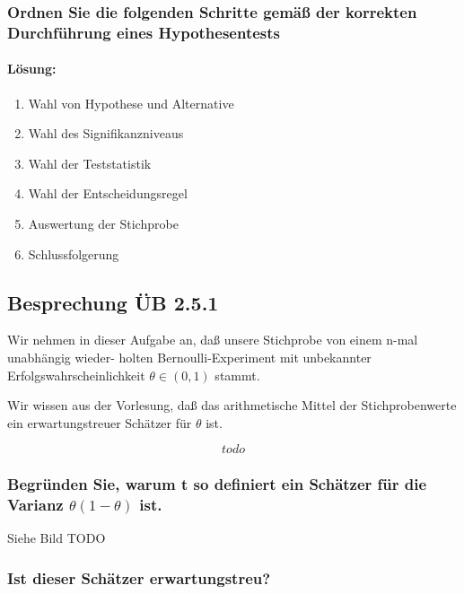 
\begin{auf}
    \subsubsection*{Ordnen Sie die folgenden Schritte gemäß der korrekten Durchführung eines Hypothesentests}
    \paragraph{Lösung:}
    \begin{enumerate}
        \item Wahl von Hypothese und Alternative
        \item Wahl des Signifikanzniveaus
        \item Wahl der Teststatistik
        \item Wahl der Entscheidungsregel
        \item Auswertung der Stichprobe
        \item Schlussfolgerung
    \end{enumerate}
\end{auf}

\subsection{Besprechung ÜB 2.5.1}\label{sec:besprechung-ub-2.5.1}
Wir nehmen in dieser Aufgabe an, daß unsere Stichprobe von einem n-mal unabhängig wieder-
holten Bernoulli-Experiment mit unbekannter Erfolgswahrscheinlichkeit $\theta \in (0, 1)$ stammt.

Wir wissen aus der Vorlesung, daß das arithmetische Mittel der Stichprobenwerte ein erwartungstreuer Schätzer für $\theta$ ist.

\[
todo
\]

\begin{auf}
    \subsubsection*{Begründen Sie, warum t so definiert ein Schätzer für die Varianz $\theta(1- \theta)$ ist.}
    Siehe Bild TODO %
    \subsubsection*{Ist dieser Schätzer erwartungstreu?}
\end{auf}

